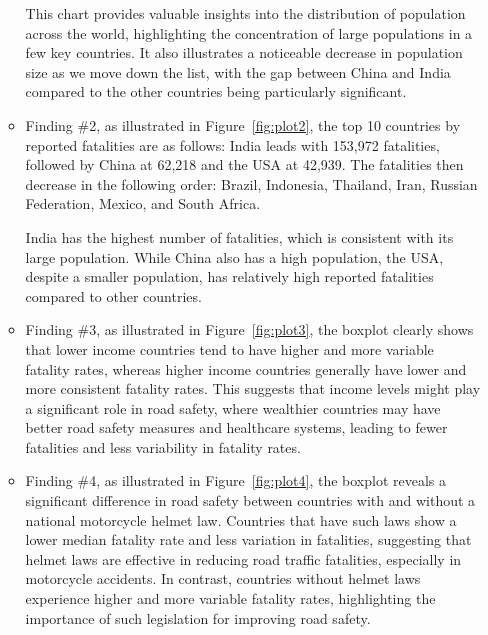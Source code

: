 \documentclass[a4paper,10pt]{article}\setlength{\textheight}{10in}\setlength{\textwidth}{6.5in}\setlength{\topmargin}{-0.125in}\setlength{\oddsidemargin}{-.2in}\setlength{\evensidemargin}{-.2in}\setlength{\headsep}{0.2in}\setlength{\footskip}{0pt}\usepackage{amsmath}\usepackage{fancyhdr}\usepackage{enumitem}\usepackage{hyperref}\usepackage{xcolor}\usepackage{graphicx}\usepackage[export]{adjustbox}\usepackage{caption}\usepackage{float}\usepackage{booktabs}\usepackage{makecell}\pagestyle{fancy}
\begin{document}
\begin{enumerate}[topsep=0mm, partopsep=0mm, leftmargin=*]
\begin{itemize}
This chart provides valuable insights into the distribution of population across the world, highlighting the concentration of large populations in a few key countries. It also illustrates a noticeable decrease in population size as we move down the list, with the gap between China and India compared to the other countries being particularly significant.
        \item Finding \#2, as illustrated in Figure~\ref{fig:plot2}, the top 10 countries by reported fatalities are as follows: India leads with 153,972 fatalities, followed by China at 62,218 and the USA at 42,939. The fatalities then decrease in the following order: Brazil, Indonesia, Thailand, Iran, Russian Federation, Mexico, and South Africa.

India has the highest number of fatalities, which is consistent with its large population. While China also has a high population, the USA, despite a smaller population, has relatively high reported fatalities compared to other countries.
        \item Finding \#3, as illustrated in Figure~\ref{fig:plot3}, the boxplot clearly shows that lower income countries tend to have higher and more variable fatality rates, whereas higher income countries generally have lower and more consistent fatality rates. This suggests that income levels might play a significant role in road safety, where wealthier countries may have better road safety measures and healthcare systems, leading to fewer fatalities and less variability in fatality rates.
        
        \item Finding \#4, as illustrated in Figure~\ref{fig:plot4}, the boxplot reveals a significant difference in road safety between countries with and without a national motorcycle helmet law. Countries that have such laws show a lower median fatality rate and less variation in fatalities, suggesting that helmet laws are effective in reducing road traffic fatalities, especially in motorcycle accidents. In contrast, countries without helmet laws experience higher and more variable fatality rates, highlighting the importance of such legislation for improving road safety.
    \end{itemize}







\end{enumerate}
\end{document}
